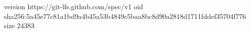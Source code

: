 version https://git-lfs.github.com/spec/v1
oid sha256:5a45e77c81a1bd9a4b45a53b4849c5baa8bc8d90a2818d1711fddef35704f776
size 24383
